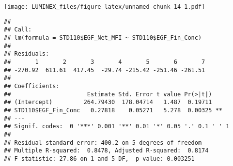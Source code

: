 \documentclass[]{article}
\newenvironment{Shaded}{\begin{snugshade}}{\end{snugshade}}
\newcommand{\CommentTok}[1]{\textcolor[rgb]{0.56,0.35,0.01}{\textit{#1}}}
\newcommand{\DataTypeTok}[1]{\textcolor[rgb]{0.13,0.29,0.53}{#1}}
\newcommand{\KeywordTok}[1]{\textcolor[rgb]{0.13,0.29,0.53}{\textbf{#1}}}
\newcommand{\NormalTok}[1]{#1}
\newcommand{\OperatorTok}[1]{\textcolor[rgb]{0.81,0.36,0.00}{\textbf{#1}}}
\newcommand{\StringTok}[1]{\textcolor[rgb]{0.31,0.60,0.02}{#1}}
\begin{document}
\begin{Shaded}
\end{Shaded}

\texttt{[image: LUMINEX\_files/figure-latex/unnamed-chunk-14-1.pdf]}

\begin{Shaded}
\end{Shaded}

\begin{verbatim}
## 
## Call:
## lm(formula = STD110$EGF_Net_MFI ~ STD110$EGF_Fin_Conc)
## 
## Residuals:
##       1       2       3       4       5       6       7 
## -270.92  611.61  417.45  -29.74 -215.42 -251.46 -261.51 
## 
## Coefficients:
##                      Estimate Std. Error t value Pr(>|t|)   
## (Intercept)         264.79430  178.04714   1.487  0.19711   
## STD110$EGF_Fin_Conc   0.27818    0.05271   5.278  0.00325 **
## ---
## Signif. codes:  0 '***' 0.001 '**' 0.01 '*' 0.05 '.' 0.1 ' ' 1
## 
## Residual standard error: 400.2 on 5 degrees of freedom
## Multiple R-squared:  0.8478, Adjusted R-squared:  0.8174 
## F-statistic: 27.86 on 1 and 5 DF,  p-value: 0.003251
\end{verbatim}
\end{document}
